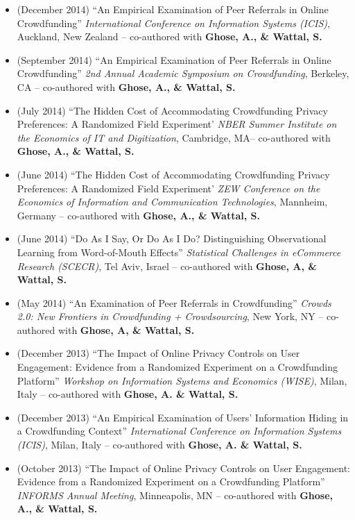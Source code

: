 \documentclass[10.5pt,letterpaper,sans]{moderncv}        %
\begin{document}
\begin{itemize}
\item (December 2014) ``An Empirical Examination of Peer Referrals in Online Crowdfunding'' \textit{International Conference on Information Systems (ICIS)}, Auckland, New Zealand -- co-authored with \textbf{Ghose, A., \& Wattal, S.}

\item (September 2014) ``An Empirical Examination of Peer Referrals in Online Crowdfunding'' \textit{2nd Annual Academic Symposium on Crowdfunding}, Berkeley, CA -- co-authored with \textbf{Ghose, A., \& Wattal, S.}

\item (July 2014) ``The Hidden Cost of Accommodating Crowdfunding Privacy Preferences: A Randomized Field Experiment' \textit{NBER Summer Institute on the Economics of IT and Digitization}, Cambridge, MA-- co-authored with \textbf{Ghose, A., \& Wattal, S.}

\item (June 2014) ``The Hidden Cost of Accommodating Crowdfunding Privacy Preferences: A Randomized Field Experiment' \textit{ZEW Conference on the Economics of Information and Communication Technologies}, Mannheim, Germany -- co-authored with \textbf{Ghose, A., \& Wattal, S.}

\item (June 2014) ``Do As I Say, Or Do As I Do? Distinguishing Observational Learning from Word-of-Mouth Effects'' \textit{Statistical Challenges in eCommerce Research (SCECR)}, Tel Aviv, Israel -- co-authored with \textbf{Ghose, A, \& Wattal, S.}

\item (May 2014) ``An Examination of Peer Referrals in Crowdfunding'' \textit{Crowds 2.0: New Frontiers in Crowdfunding + Crowdsourcing}, New York, NY -- co-authored with \textbf{Ghose, A, \& Wattal, S.}

\item (December 2013) ``The Impact of Online Privacy Controls on User Engagement: Evidence from a Randomized Experiment on a Crowdfunding Platform'' \textit{Workshop on Information Systems and Economics (WISE)}, Milan, Italy -- co-authored with \textbf{Ghose, A. \& Wattal, S.}

\item (December 2013) ``An Empirical Examination of Users' Information Hiding in a Crowdfunding Context'' \textit{International Conference on Information Systems (ICIS)}, Milan, Italy -- co-authored with \textbf{Ghose, A. \& Wattal, S.}

\item (October 2013) ``The Impact of Online Privacy Controls on User Engagement: Evidence from a Randomized Experiment on a Crowdfunding Platform'' \textit{INFORMS Annual Meeting}, Minneapolis, MN -- co-authored with \textbf{Ghose, A., \& Wattal, S.}


\end{itemize}
\end{document}

